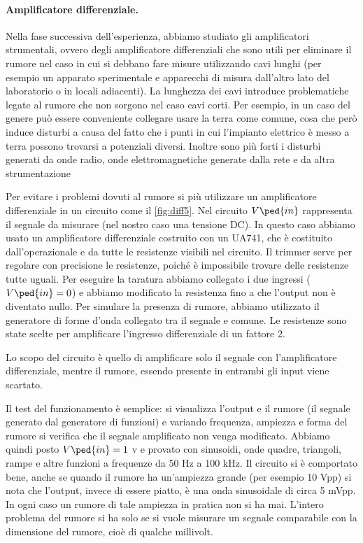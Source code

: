 \paragraph{Amplificatore differenziale.}

Nella fase successiva dell'esperienza, abbiamo studiato gli amplificatori strumentali, ovvero degli
amplificatore differenziali che sono utili per eliminare il rumore nel caso in cui si debbano fare misure
utilizzando cavi lunghi (per esempio un apparato sperimentale e apparecchi di misura dall'altro lato
del laboratorio o in locali adiacenti). La lunghezza dei cavi introduce problematiche legate al rumore che non
sorgono nel caso cavi corti. Per esempio, in un caso del genere può essere conveniente collegare usare la terra
come comune, cosa che però induce disturbi a causa del fatto che i punti in cui l'impianto elettrico è messo a terra
possono trovarsi a potenziali diversi. Inoltre sono più forti i disturbi generati da onde radio, onde elettromagnetiche
generate dalla rete e da altra strumentazione

Per evitare i problemi dovuti al rumore si più utilizzare un amplificatore differenziale in un circuito come il
\ref{fig:diff5}. Nel circuito $V\ped{in}$ rappresenta il segnale da misurare (nel nostro caso una tensione DC).
In questo caso abbiamo usato un amplificatore differenziale costruito con un UA741, che è costituito dall'operazionale
e da tutte le resistenze visibili nel circuito. Il trimmer serve per regolare con precisione le resistenze,
poiché è impossibile trovare delle resistenze tutte uguali. Per eseguire la taratura abbiamo collegato i due ingressi
($V\ped{in} = 0$) e abbiamo modificato la resistenza fino a che l'output non è diventato nullo. 
Per simulare la presenza di rumore, abbiamo utilizzato il generatore di forme d'onda collegato tra il segnale e comune.
Le resistenze sono state scelte per amplificare l'ingresso differenziale di un fattore 2.

Lo scopo del circuito è quello di amplificare solo il segnale con l'amplificatore differenziale, mentre il rumore,
essendo presente in entrambi gli input viene scartato.

Il test del funzionamento è semplice: si visualizza l'output e il rumore (il segnale generato dal generatore di funzioni)
e variando frequenza, ampiezza e forma del rumore si verifica che il segnale amplificato non venga modificato.
Abbiamo quindi posto $V\ped{in} = 1$ v e provato con sinusoidi, onde quadre, triangoli, rampe e altre funzioni a frequenze
da 50 Hz a 100 kHz. Il circuito si è comportato bene, anche se quando il rumore ha un'ampiezza grande (per esempio 10 Vpp)
si nota che l'output, invece di essere piatto, è una onda sinusoidale di circa 5 mVpp. In ogni caso un rumore di tale
ampiezza in pratica non si ha mai. L'intero problema del rumore si ha solo se si vuole misurare un segnale comparabile
con la dimensione del rumore, cioè di qualche millivolt.

